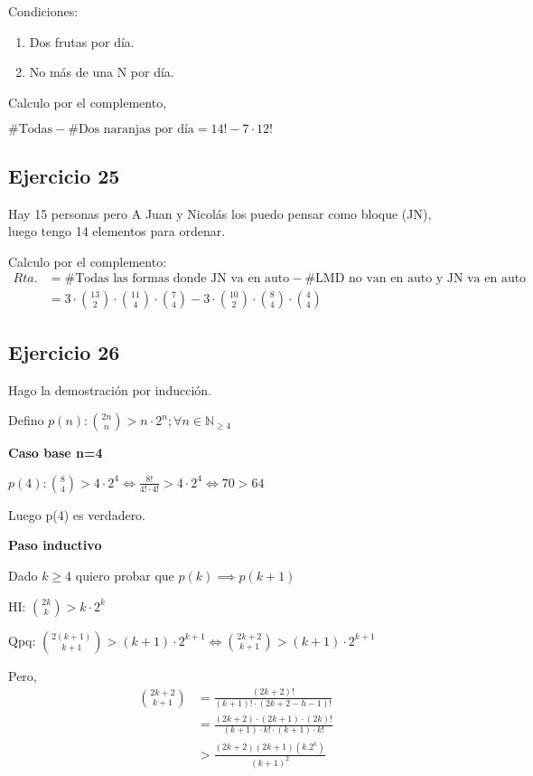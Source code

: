 Condiciones:
\begin{enumerate}
    \item Dos frutas por día.
    \item No más de una N por día.
\end{enumerate}

Calculo por el complemento,

$ \# \text{Todas} - \# \text{Dos naranjas por día} = 14! - 7 \cdot 12!$

\subsection{Ejercicio 25}

Hay 15 personas pero A Juan y Nicolás los puedo pensar como bloque (JN), luego tengo 14 elementos para ordenar.

Calculo por el complemento: 
\begin{align*}
    Rta. &= \# \text{Todas las formas donde JN va en auto} - \# \text{LMD no van en auto y JN va en auto} \\
    &= 3 \cdot \binom{13}{2} \cdot \binom{11}{4} \cdot \binom{7}{4} - 3 \cdot \binom{10}{2} \cdot \binom{8}{4} \cdot \binom{4}{4}
\end{align*}

\subsection{Ejercicio 26}
Hago la demostración por inducción.

Defino $ p(n): \binom{2n}{n} > n\cdot 2^n; \forall n \in \mathbb{N}_{\geq 4} $

\textbf{Caso base n=4}

$ p(4): \binom{8}{4} > 4 \cdot 2^4 \iff \frac{8!}{4! \cdot 4!} > 4 \cdot 2^4 \iff 70 > 64 $

Luego p(4) es verdadero.

\textbf{Paso inductivo}

Dado $ k \geq 4 $ quiero probar que $ p(k) \implies p(k+1) $

HI: $ \binom{2k}{k} > k \cdot 2^k $

Qpq: $\binom{2(k+1)}{k+1} > (k+1) \cdot 2^{k+1} \iff \binom{2k+2}{k+1} > (k+1) \cdot 2^{k+1} $

Pero,
\begin{align*}
    \binom{2k+2}{k+1} &= \frac{(2k+2)!}{(k+1)! \cdot (2k+2-h-1)!} \\
    &= \frac{(2k+2) \cdot (2k+1) \cdot (2k)!}{(k+1)\cdot k! \cdot (k+1) \cdot k!} \\
    &> \frac{(2k+2)(2k+1)(k.2^k)}{(k+1)^2}
\end{align*}

